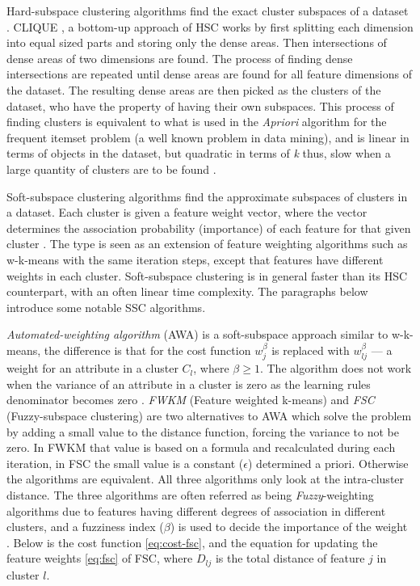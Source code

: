 \documentclass[../report.tex]{subfiles}
\begin{document}
Hard-subspace clustering algorithms find the exact cluster subspaces of a dataset \cite{Kriegler2012, Jia2018, Jing2007,Deng2016}. CLIQUE \cite{Jing2007}, a bottom-up approach of HSC works by first splitting each dimension into equal sized parts and storing only the dense areas. Then intersections of dense areas of two dimensions are found. The process of finding dense intersections are repeated until dense areas are found for all feature dimensions of the dataset. The resulting dense areas are then picked as the clusters of the dataset, who have the property of having their own subspaces. This process of finding clusters is equivalent to what is used in the \textit{Apriori} algorithm for the frequent itemset problem (a well known problem in data mining), and is linear in terms of objects in the dataset, but quadratic in terms of \textit{k} thus, slow when a large quantity of clusters are to be found \cite{Kriegler2012, Xu2015}.  

Soft-subspace clustering algorithms find the approximate subspaces of clusters in a dataset. Each cluster is given a feature weight vector, where the vector determines the association probability (importance) of each feature for that given cluster \cite{Gan2016, Jia2018, Jing2007}. The type is seen as an extension of feature weighting algorithms such as w-k-means with the same iteration steps, except that features have different weights in each cluster. Soft-subspace clustering is in general faster than its HSC counterpart, with an often linear time complexity. The paragraphs below introduce some notable SSC algorithms.

\textit{Automated-weighting algorithm} (AWA) \cite{Chan2004} is a soft-subspace approach similar to w-k-means, the difference is that for the cost function $w_j^\beta$ is replaced with $w_{ lj }^\beta$ --- a weight for an attribute in a cluster $C_l$, where $\beta \geq 1$. The algorithm does not work when the variance of an attribute in a cluster is zero as the learning rules denominator becomes zero \cite{Jing2005}. \textit{FWKM} (Feature weighted k-means) \cite{Jing2005} and \textit{FSC} (Fuzzy-subspace clustering) \cite{Gan2006} are two alternatives to AWA which solve the problem by adding a small value to the distance function, forcing the variance to not be zero. In FWKM that value is based on a formula and recalculated during each iteration, in FSC the small value is a constant ($\epsilon$) determined a priori. Otherwise the algorithms are equivalent. All three algorithms only look at the intra-cluster distance. The three algorithms are often referred as being \textit{Fuzzy}-weighting algorithms due to features having different degrees of association in different clusters, and a fuzziness index ($\beta$) is used to decide the importance of the weight \cite{Gan2006}. Below is the cost function \cref{eq:cost-fsc}, and the equation for updating the feature weights \cref{eq:fsc} of FSC, where $D_{lj}$ is the total distance of feature $j$ in cluster $l$.
\end{document}
